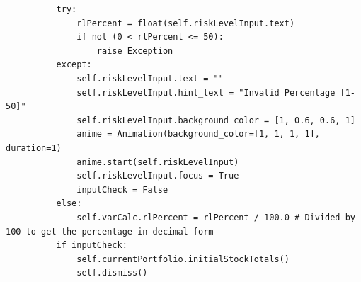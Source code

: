 \documentclass{article}
\begin{document}
\begin{verbatim}
          try:
              rlPercent = float(self.riskLevelInput.text)
              if not (0 < rlPercent <= 50):
                  raise Exception
          except:
              self.riskLevelInput.text = ""
              self.riskLevelInput.hint_text = "Invalid Percentage [1-50]"
              self.riskLevelInput.background_color = [1, 0.6, 0.6, 1]
              anime = Animation(background_color=[1, 1, 1, 1], duration=1)
              anime.start(self.riskLevelInput)
              self.riskLevelInput.focus = True
              inputCheck = False
          else:
              self.varCalc.rlPercent = rlPercent / 100.0 # Divided by 100 to get the percentage in decimal form
          if inputCheck:
              self.currentPortfolio.initialStockTotals()
              self.dismiss()
\end{verbatim}
\vspace{0.5cm}
\end{document}
